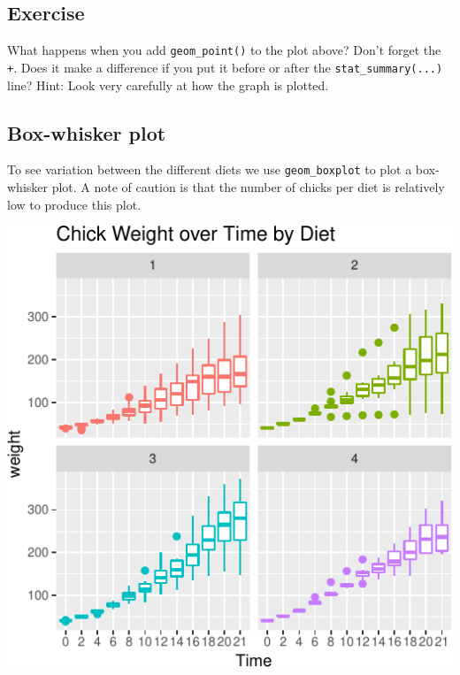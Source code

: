 \documentclass[letterpaperpaper,9pt,twocolumn,twoside,printwatermark=false]{pinp}
\begin{document}
\hypertarget{exercise-7}{%
\subsection{Exercise}\label{exercise-7}}

What happens when you add \texttt{geom\_point()} to the plot above?
Don't forget the \texttt{+}. Does it make a difference if you put it
before or after the \texttt{stat\_summary(...)} line? Hint: Look very
carefully at how the graph is plotted.

\hypertarget{box-whisker-plot}{%
\subsection{Box-whisker plot}\label{box-whisker-plot}}

To see variation between the different diets we use
\texttt{geom\_boxplot} to plot a box-whisker plot. A note of caution is
that the number of chicks per diet is relatively low to produce this
plot.

\begin{Shaded}
\begin{Highlighting}[]
\OperatorTok{+}
\StringTok{  }\NormalTok{(}\OperatorTok{~}\StringTok{ }\OperatorTok{+}
\StringTok{  }\NormalTok{() }\OperatorTok{+}
\StringTok{  }\NormalTok{(} \NormalTok{) }\OperatorTok{+}
\StringTok{  }\NormalTok{(}\NormalTok{)}
\end{Highlighting}
\end{Shaded}

\begin{center}\includegraphics{Getting-Started-in-R_files/figure-latex/boxPlot-1} \end{center}
\end{document}
